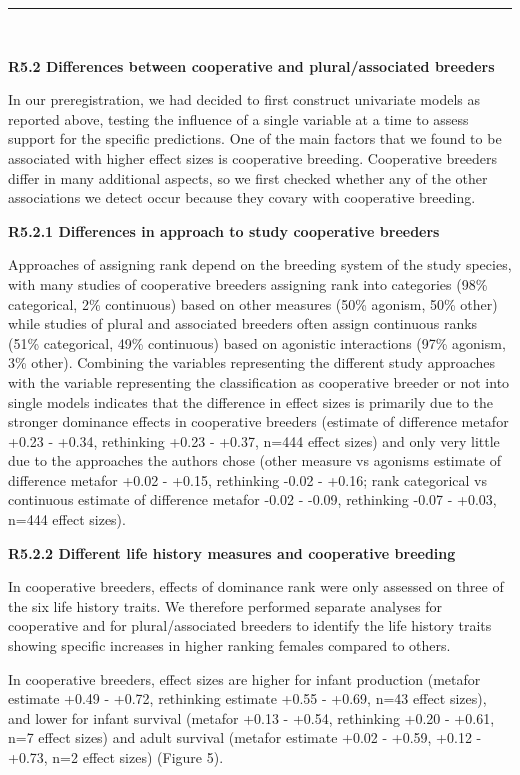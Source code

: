 \documentclass[
]{article}
\begin{document}
\begin{center}\rule{0.5\linewidth}{0.5pt}\end{center}

~

\textbf{R5.2 Differences between cooperative and plural/associated
breeders}

In our preregistration, we had decided to first construct univariate
models as reported above, testing the influence of a single variable at
a time to assess support for the specific predictions. One of the main
factors that we found to be associated with higher effect sizes is
cooperative breeding. Cooperative breeders differ in many additional
aspects, so we first checked whether any of the other associations we
detect occur because they covary with cooperative breeding.

\textbf{R5.2.1 Differences in approach to study cooperative breeders}

Approaches of assigning rank depend on the breeding system of the study
species, with many studies of cooperative breeders assigning rank into
categories (98\% categorical, 2\% continuous) based on other measures
(50\% agonism, 50\% other) while studies of plural and associated
breeders often assign continuous ranks (51\% categorical, 49\%
continuous) based on agonistic interactions (97\% agonism, 3\% other).
Combining the variables representing the different study approaches with
the variable representing the classification as cooperative breeder or
not into single models indicates that the difference in effect sizes is
primarily due to the stronger dominance effects in cooperative breeders
(estimate of difference metafor +0.23 - +0.34, rethinking +0.23 - +0.37,
n=444 effect sizes) and only very little due to the approaches the
authors chose (other measure vs agonisms estimate of difference metafor
+0.02 - +0.15, rethinking -0.02 - +0.16; rank categorical vs continuous
estimate of difference metafor -0.02 - -0.09, rethinking -0.07 - +0.03,
n=444 effect sizes).

\textbf{R5.2.2 Different life history measures and cooperative breeding}

In cooperative breeders, effects of dominance rank were only assessed on
three of the six life history traits. We therefore performed separate
analyses for cooperative and for plural/associated breeders to identify
the life history traits showing specific increases in higher ranking
females compared to others.

In cooperative breeders, effect sizes are higher for infant production
(metafor estimate +0.49 - +0.72, rethinking estimate +0.55 - +0.69, n=43
effect sizes), and lower for infant survival (metafor +0.13 - +0.54,
rethinking +0.20 - +0.61, n=7 effect sizes) and adult survival (metafor
estimate +0.02 - +0.59, +0.12 - +0.73, n=2 effect sizes) (Figure 5).
\end{document}
